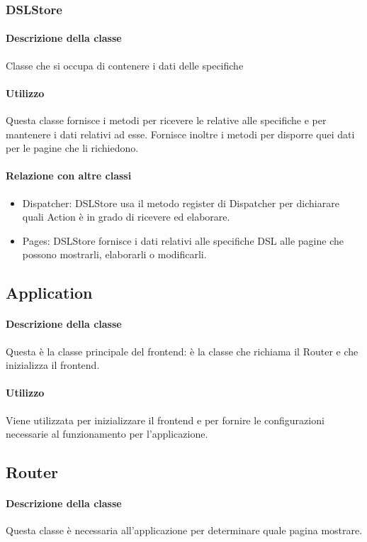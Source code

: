 \subsubsection{DSLStore}
\paragraph*{Descrizione della classe}
Classe che si occupa di contenere i dati delle specifiche 
\paragraph*{Utilizzo}
Questa classe fornisce i metodi per ricevere le  relative alle specifiche  e per mantenere i dati relativi ad esse. Fornisce inoltre i metodi per disporre quei dati per le pagine che li richiedono.
\paragraph*{Relazione con altre classi}
\begin{itemize}
\item Dispatcher: DSLStore usa il metodo register di Dispatcher per dichiarare quali Action è in grado di ricevere ed elaborare.
\item Pages: DSLStore fornisce i dati relativi alle specifiche DSL alle pagine che possono mostrarli, elaborarli o modificarli.
\end{itemize}


\subsection{Application}
\paragraph*{Descrizione della classe}
Questa è la classe principale del frontend: è la classe che richiama il Router e che inizializza il frontend.
\paragraph*{Utilizzo}
Viene utilizzata per inizializzare il frontend e per fornire le configurazioni necessarie al funzionamento per l'applicazione.

\subsection{Router}
\paragraph*{Descrizione della classe}
Questa classe è necessaria all'applicazione per determinare quale pagina mostrare.
